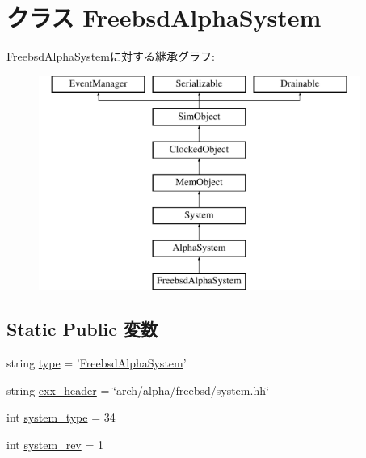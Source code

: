 \hypertarget{classAlphaSystem_1_1FreebsdAlphaSystem}{
\section{クラス FreebsdAlphaSystem}
\label{classAlphaSystem_1_1FreebsdAlphaSystem}
}
FreebsdAlphaSystemに対する継承グラフ:\begin{figure}[H]
\begin{center}
\leavevmode
\includegraphics[height=7cm]{classAlphaSystem_1_1FreebsdAlphaSystem}
\end{center}
\end{figure}
\subsection*{Static Public 変数}
\begin{DoxyCompactItemize}
\item 
string \hyperlink{classAlphaSystem_1_1FreebsdAlphaSystem_acce15679d830831b0bbe8ebc2a60b2ca}{type} = '\hyperlink{classAlphaSystem_1_1FreebsdAlphaSystem}{FreebsdAlphaSystem}'
\item 
string \hyperlink{classAlphaSystem_1_1FreebsdAlphaSystem_a17da7064bc5c518791f0c891eff05fda}{cxx\_\-header} = \char`\"{}arch/alpha/freebsd/system.hh\char`\"{}
\item 
int \hyperlink{classAlphaSystem_1_1FreebsdAlphaSystem_acfe3506cfe10e05a2cb2c2973dc5dad2}{system\_\-type} = 34
\item 
int \hyperlink{classAlphaSystem_1_1FreebsdAlphaSystem_a261e4081ddd1f0823eccc0f042086c27}{system\_\-rev} = 1
\end{DoxyCompactItemize}


